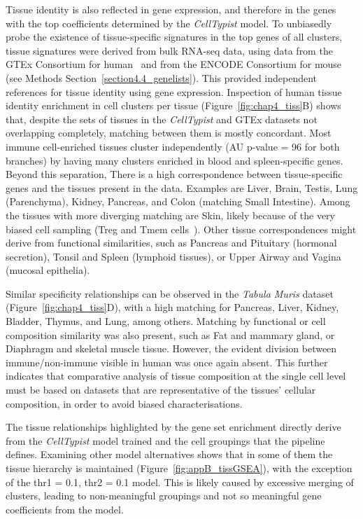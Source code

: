 Tissue identity is also reflected in gene expression, and therefore in the genes with the top coefficients determined by the \textit{CellTypist} model. To unbiasedly probe the existence of tissue-specific signatures in the top genes of all clusters, tissue signatures were derived from bulk RNA-seq data, using data from the GTEx Consortium for human~\citep{consortium_genotype-tissue_2015} and from the ENCODE Consortium for mouse~\citep{dunham_integrated_2012} (see Methods Section~\ref{section4.4_genelists}). This provided independent references for tissue identity using gene expression. Inspection of human tissue identity enrichment in cell clusters per tissue (Figure~\ref{fig:chap4_tiss}B) shows that, despite the sets of tissues in the \textit{CellTypist} and GTEx datasets not overlapping completely, matching between them is mostly concordant. Most immune cell-enriched tissues cluster independently (AU p-value = 96 for both branches) by having many clusters enriched in blood and spleen-specific genes. Beyond this separation, There is a high correspondence between tissue-specific genes and the tissues present in the data. Examples are Liver, Brain, Testis, Lung (Parenchyma), Kidney, Pancreas, and Colon (matching Small Intestine). Among the tissues with more diverging matching are Skin, likely because of the very biased cell sampling (Treg and Tmem cells~\citep{miragaia_single-cell_2019}). Other tissue correspondences might derive from functional similarities, such as Pancreas and Pituitary (hormonal secretion), Tonsil and Spleen (lymphoid tissues), or Upper Airway and Vagina (mucosal epithelia).

Similar specificity relationships can be observed in the \textit{Tabula Muris} dataset (Figure~\ref{fig:chap4_tiss}D), with a high matching for Pancreas, Liver, Kidney, Bladder, Thymus, and Lung, among others. Matching by functional or cell composition similarity was also present, such as Fat and mammary gland, or Diaphragm and skeletal muscle tissue. However, the evident division between immune/non-immune visible in human was once again absent. This further indicates that comparative analysis of tissue composition at the single cell level must be based on datasets that are representative of the tissues’ cellular composition, in order to avoid biased characterisations.

The tissue relationships highlighted by the gene set enrichment directly derive from the \textit{CellTypist} model trained and the cell groupings that the pipeline defines. Examining other model alternatives shows that in some of them the tissue hierarchy is maintained (Figure~\ref{fig:appB_tissGSEA}), with the exception of the thr1 = 0.1, thr2 = 0.1 model. This is likely caused by excessive merging of clusters, leading to non-meaningful groupings and not so meaningful gene coefficients from the model.

